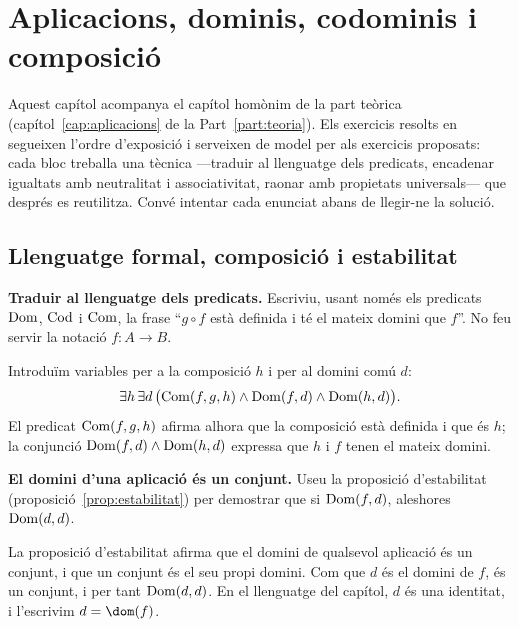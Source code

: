 \chapter{Aplicacions, dominis, codominis i composició}\label{cap:practica-aplicacions}

Aquest capítol acompanya el capítol homònim de la part teòrica (capítol~\ref{cap:aplicacions} de la Part~\ref{part:teoria}). Els exercicis resolts en segueixen l'ordre d'exposició i serveixen de model per als exercicis proposats: cada bloc treballa una tècnica ---traduir al llenguatge dels predicats, encadenar igualtats amb neutralitat i associativitat, raonar amb propietats universals--- que després es reutilitza. Convé intentar cada enunciat abans de llegir-ne la solució.

\section{Llenguatge formal, composició i estabilitat}\label{prac:axiomes}

\begin{exercici}
\textbf{Traduir al llenguatge dels predicats.} Escriviu, usant només els predicats \(\operatorname{Dom}\), \(\operatorname{Cod}\) i \(\operatorname{Com}\), la frase \enquote{\(g\circ f\) està definida i té el mateix domini que \(f\)}. No feu servir la notació \(f\colon A\to B\).
\end{exercici}
\begin{solucio}
Introduïm variables per a la composició \(h\) i per al domini comú \(d\):
\[
\exists h\,\exists d\,\bigl(\operatorname{Com}(f,g,h)\land\operatorname{Dom}(f,d)\land\operatorname{Dom}(h,d)\bigr).
\]
El predicat \(\operatorname{Com}(f,g,h)\) afirma alhora que la composició està definida i que és \(h\); la conjunció \(\operatorname{Dom}(f,d)\land\operatorname{Dom}(h,d)\) expressa que \(h\) i \(f\) tenen el mateix domini.
\end{solucio}

\begin{exercici}
\textbf{El domini d'una aplicació és un conjunt.} Useu la proposició d'estabilitat (proposició~\ref{prop:estabilitat}) per demostrar que si \(\operatorname{Dom}(f,d)\), aleshores \(\operatorname{Dom}(d,d)\).
\end{exercici}
\begin{solucio}
La proposició d'estabilitat afirma que el domini de qualsevol aplicació és un conjunt, i que un conjunt és el seu propi domini. Com que \(d\) és el domini de \(f\), és un conjunt, i per tant \(\operatorname{Dom}(d,d)\). En el llenguatge del capítol, \(d\) és una identitat, i l'escrivim \(d=\dom(f)\).
\end{solucio}

